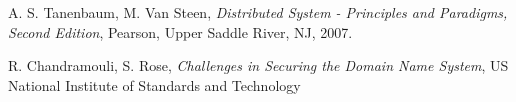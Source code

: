 \documentclass[a4paper,10pt]{report}
\begin{document}











\begin{thebibliography}{9}

	A. S. Tanenbaum, M. Van Steen, \emph{Distributed System - Principles and Paradigms, Second Edition}, Pearson, Upper Saddle River, NJ, 2007.

	 R. Chandramouli, S. Rose, \emph{Challenges in Securing the Domain Name System},  US National Institute of Standards and Technology
	
\end{thebibliography}
\end{document}
